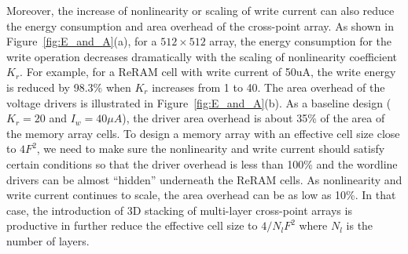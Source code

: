 Moreover, the increase of nonlinearity or scaling of write current can
also reduce the energy consumption and area overhead of the cross-point
array. As shown in Figure~\ref{fig:E_and_A}(a), for a $512 \times 512$
array, the energy consumption for the write operation decreases
dramatically with the scaling of nonlinearity coefficient $K_r$. For
example, for a ReRAM cell with write current of 50uA, the write energy is
reduced by 98.3\% when $K_r$ increases from 1 to 40. The area overhead of
the voltage drivers is illustrated in Figure~\ref{fig:E_and_A}(b). As a
baseline design ($K_r=20$ and $I_w=40\mu A$), the driver area overhead is
about 35\% of the area of the memory array cells. To design a memory array
with an effective cell size close to $4F^2$, we need to make sure the
nonlinearity and write current should satisfy certain conditions so that
the driver overhead is less than 100\% and the wordline drivers can be
almost ``hidden'' underneath the ReRAM cells. As nonlinearity and write
current continues to scale, the area overhead can be as low as 10\%. In
that case, the introduction of 3D stacking of multi-layer cross-point
arrays is productive in further reduce the effective cell size to $4/N_l
F^2$ where $N_l$ is the number of layers.



